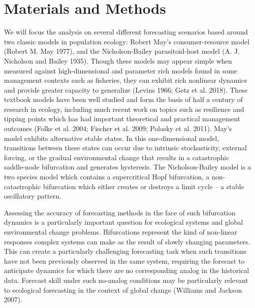 \documentclass{article}
\begin{document}
\hypertarget{materials-and-methods}{%
\section{Materials and Methods}\label{materials-and-methods}}

We will focus the analysis on several different forecasting scenarios
based around two classic models in population ecology: Robert May's
consumer-resource model (Robert M. May 1977), and the Nicholson-Bailey
parasitoid-host model (A. J. Nicholson and Bailey 1935). Though these
models may appear simple when measured against high-dimensional and
parameter rich models found in some management contexts such as
fisheries, they can exhibit rich nonlinear dynamics and provide greater
capacity to generalize (Levins 1966; Getz et al. 2018). These textbook
models have been well studied and form the basis of half a century of
research in ecology, including much recent work on topics such as
resilience and tipping points which has had important theoretical and
practical management outcomes (Folke et al. 2004; Fischer et al. 2009;
Polasky et al. 2011). May's model exhibits alternative stable states. In
this one-dimensional model, transitions between these states can occur
due to intrinsic stochasticity, external forcing, or the gradual
environmental change that results in a catastrophic saddle-node
bifurcation and generates hysteresis. The Nicholson-Bailey model is a
two species model which contains a supercritical Hopf bifurcation, a
non-catastrophic bifurcation which either creates or destroys a limit
cycle -- a stable oscillatory pattern.

Assessing the accuracy of forecasting methods in the face of such
bifurcation dynamics is a particularly important question for ecological
systems and global environmental change problems. Bifurcations represent
the kind of non-linear responses complex systems can make as the result
of slowly changing parameters. This can create a particularly
challenging forecasting task when such transitions have not been
previously observed in the same system, requiring the forecast to
anticipate dynamics for which there are no corresponding analog in the
historical data. Forecast skill under such no-analog conditions may be
particularly relevant to ecological forecasting in the context of global
change (Williams and Jackson 2007).
\end{document}
